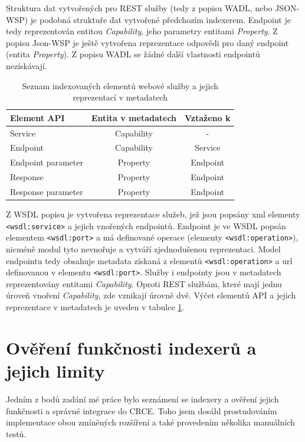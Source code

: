 \documentclass[czech,DP]{thesiskiv}
\begin{document}
Struktura dat vytvořených pro REST služby (tedy z popisu WADL, nebo JSON-WSP) je podobná struktuře dat vytvořené předchozím indexerem. Endpoint je tedy reprezentován entitou \textit{Capability}, jeho parametry entitami \textit{Property}. Z popisu Json-WSP je ještě vytvořena reprezentace odpovědi pro daný endpoint (entita \textit{Property}). Z popisu WADL se žádné další vlastnosti endpointů nezískávají.

\begin{table}[h]
	\centering
	\begin{tabular}{|l | c | c |}
		\hline
		Element API & Entita v metadatech & Vztaženo k \\
		\hline
		\hline
		Service & Capability & - \\
		\hline
		Endpoint & Capability & Service \\
		\hline
		Endpoint parameter & Property & Endpoint \\
		\hline
		Response & Property & Endpoint \\
		\hline
		Response parameter & Property & Endpoint \\
		\hline
	\end{tabular}
	\caption{Seznam indexovaných elementů webové služby a jejich reprezentací v metadatech}
	\label{tab:ws-indexed}
\end{table}

Z WSDL popisu je vytvořena reprezentace služeb, jež jsou popsány xml elementy \verb|<wsdl:service>| a jejich vnořených endpointů. Endpoint je ve WSDL popsán elementem \verb|<wsdl:port>| a má definované operace (elementy \verb|<wsdl:operation>|), nicméně modul tyto nevnořuje a vytváří zjednodušenou reprezentaci. Model endpointu tedy obsahuje metadata získaná z elementů \verb|<wsdl:operation>| a url definovanou v elementu \verb|<wsdl:port>|. Služby i endpointy jsou v metadatech reprezentovány entitami \textit{Capability}. Oproti REST službám, které mají jednu úroveň vnoření \textit{Capability}, zde vznikají úrovně dvě. Výčet elementů API a jejich reprezentace v metadatech je uveden v tabulce \ref{tab:ws-indexed}.


\section{Ověření funkčnosti indexerů a jejich limity}
\label{sec:index-limits}

Jedním z bodů zadání mé práce bylo seznámení se indexery a ověření jejich funkčnosti a správné integrace do CRCE. Toho jsem dosáhl prostudováním implementace obou zmíněných rozšíření a také provedením několika manuálních testů. 
\end{document}
